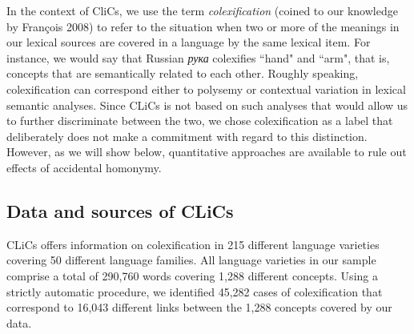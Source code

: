 In the context of CliCs, we use the term \emph{colexification} (coined to our knowledge by Fran\c{c}ois
2008) \nocite{francois2008}
to refer to the situation when two or more of the meanings in our lexical sources are covered in a
language by the same lexical item. For instance, we would say that Russian \emph{рука} colexifies ``hand"
and ``arm", that is, concepts that are semantically related to each other. Roughly speaking,
colexification can correspond either to polysemy or contextual variation in lexical semantic analyses.
Since CLiCs is not based on such analyses that would allow us to further discriminate between the
two, we chose colexification as a label that deliberately does not make a commitment with regard to
this distinction. However, as we will show below, quantitative approaches are available to rule out effects of accidental homonymy. 

\subsection{Data and sources of CLiCs}
CLiCs offers information on colexification in 215 different language varieties
covering 50 different language families. All language varieties in our sample comprise a total of
290,760 words covering 1,288 different concepts. Using a strictly automatic procedure, we identified
45,282 cases of colexification that correspond to 16,043 different links between the 1,288 concepts
covered by our data. 

